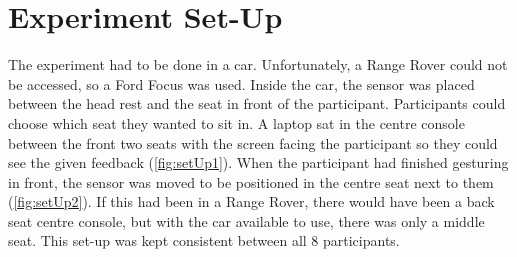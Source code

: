 \documentclass{l4proj}
\begin{document}
\section{Experiment Set-Up}
The experiment had to be done in a car. Unfortunately, a Range Rover could not be accessed, so a Ford Focus was used. Inside the car, the sensor was placed between the head rest and the seat in front of the participant. Participants could choose which seat they wanted to sit in. A laptop sat in the centre console between the front two seats with the screen facing the participant so they could see the given feedback (\ref{fig:setUp1}). When the participant had finished gesturing in front, the sensor was moved to be positioned in the centre seat next to them (\ref{fig:setUp2}). If this had been in a Range Rover, there would have been a back seat centre console, but with the car available to use, there was only a middle seat. This set-up was kept consistent between all 8 participants.
\end{document}
